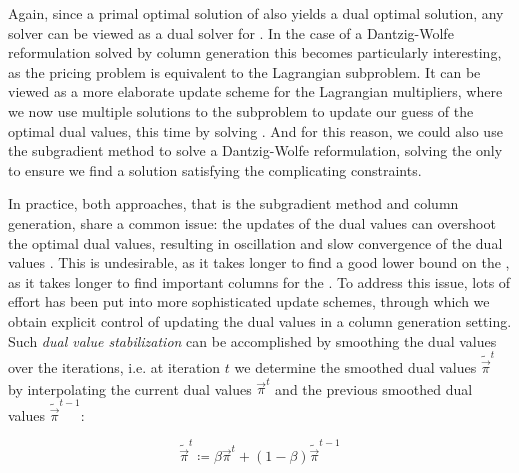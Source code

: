Again, since a primal optimal solution of \IP{} also yields a dual optimal solution, any \IP{} solver can be viewed as a dual solver for \LDP{}. In the case of a Dantzig-Wolfe reformulation solved by column generation this becomes particularly interesting, as the pricing problem is equivalent to the Lagrangian subproblem. It can be viewed as a more elaborate update scheme for the Lagrangian multipliers, where we now use multiple solutions to the subproblem to update our guess of the optimal dual values, this time by solving \MP{} \cite{thebook}. And for this reason, we could also use the subgradient method to solve a Dantzig-Wolfe reformulation, solving the \MP{} only to ensure we find a solution satisfying the complicating constraints.

In practice, both approaches, that is the subgradient method and column generation, share a common issue: the updates of the dual values can overshoot the optimal dual values, resulting in oscillation and slow convergence of the dual values \cite{thebook, pessoa2013out,bastubbe2018computational}. This is undesirable, as it takes longer to find a good lower bound on the \IP{}, as it takes longer to find important columns for the \MP{}. To address this issue, lots of effort has been put into more sophisticated update schemes, through which we obtain explicit control of updating the dual values in a column generation setting. Such \textit{dual value stabilization} can be accomplished by smoothing the dual values over the iterations, i.e. at iteration $t$ we determine the smoothed dual values $\widetilde{\vec{\pi}}^t$ by interpolating the current dual values $\vec{\pi}^{t}$ and the previous smoothed dual values $\widetilde{\vec{\pi}}^{t-1}$:

\begin{equation*}
\widetilde{\vec{\pi}}^t \coloneqq \beta \vec{\pi}^{t} + (1 - \beta) \widetilde{\vec{\pi}}^{t-1}
\end{equation*}